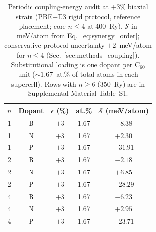\begin{table}[t]
\caption{\label{tab:sgrid}Periodic coupling-energy audit at $+3$\% biaxial strain (PBE+D3 rigid protocol, reference placement; core $n\leq 4$ at 400~Ry).
$\mathcal{S}$ in meV/atom from Eq.~\eqref{eq:synergy_order}; conservative protocol uncertainty $\pm 2$~meV/atom for $n\leq 4$ (Sec.~\ref{sec:methods_coupling}).
Substitutional loading is one dopant per C$_{60}$ unit (${\sim}1.67$~at.\% of total atoms in each supercell).
Rows with $n\geq 6$ (350~Ry) are in Supplemental Material Table~S1.}
\begin{ruledtabular}
\begin{tabular}{ccccc}
$n$ & Dopant & $\epsilon$ (\%) & at.\% & $\mathcal{S}$ (meV/atom) \\
\hline
1 & B & $+3$ & 1.67 & $-8.38$ \\
1 & N & $+3$ & 1.67 & $+2.30$ \\
1 & P & $+3$ & 1.67 & $-31.91$ \\
2 & B & $+3$ & 1.67 & $-2.18$ \\
2 & N & $+3$ & 1.67 & $+6.85$ \\
2 & P & $+3$ & 1.67 & $-28.29$ \\
4 & B & $+3$ & 1.67 & $-6.23$ \\
4 & N & $+3$ & 1.67 & $+2.95$ \\
4 & P & $+3$ & 1.67 & $-23.71$ \\
\end{tabular}
\end{ruledtabular}
\end{table}
